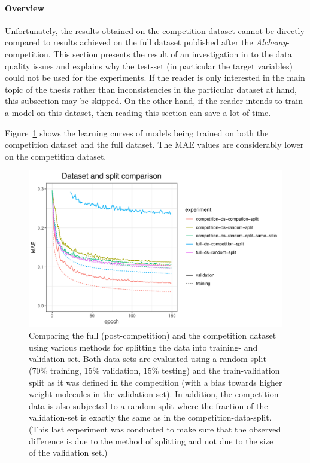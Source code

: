 
\paragraph{Overview} Unfortunately, the results obtained on the competition dataset cannot be directly compared to results achieved on the full dataset published after the \textit{Alchemy}-competition. This section presents the result of an investigation in to the data quality issues and explains why the test-set (in particular the target variables) could not be used for the experiments. If the reader is only interested in the main topic of the thesis rather than inconsistencies in the particular dataset at hand, this subsection may be skipped. On the other hand, if the reader intends to train a model on this dataset, then reading this section can save a lot of time.

Figure~\ref{fig:competition-vs-full-ds} shows the learning curves of models being trained on both the competition dataset and the full dataset. The MAE values are considerably lower on the competition dataset.


\begin{figure}[H]
	\includegraphics[width=\linewidth]{figures/competition-vs-full-ds}
	\caption{Comparing the full (post-competition) and the competition dataset using various methods for splitting the data into training- and validation-set. Both data-sets are evaluated using a random split (70\% training, 15\% validation, 15\% testing) and the train-validation split as it was defined in the competition (with a bias towards higher weight molecules in the validation set). In addition, the competition data is also subjected to a random split where the fraction of the validation-set is exactly the same as in the competition-data-split. (This last experiment was conducted to make sure that the observed difference is due to the method of splitting and not due to the size of the validation set.)}
	\label{fig:competition-vs-full-ds}
\end{figure}

